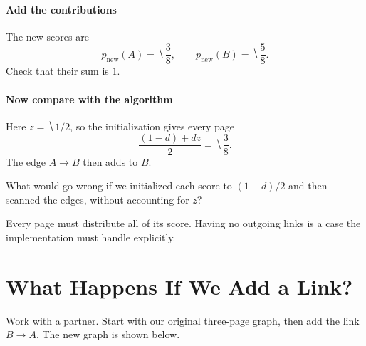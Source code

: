 \documentclass[11pt]{article}
\begin{document}
\paragraph{Add the contributions}
The new scores are
\begin{equation*}
    p_{\mathrm{new}}(A)=\hide{\frac38},\qquad
    p_{\mathrm{new}}(B)=\hide{\frac58}.
\end{equation*}
Check that their sum is $1$.

\paragraph{Now compare with the algorithm}
Here $z=\hide{1/2}$, so the initialization gives every page
\begin{equation*}
    \frac{(1-d)+dz}{2}=\hide{\frac38}.
\end{equation*}
The edge $A\to B$ then adds  to $B$.

\begin{Qu}
    What would go wrong if we initialized each score to $(1-d)/2$ and
    then scanned the edges, without accounting for $z$?
\end{Qu}
\vs{1cm}

\vfill
Every page must distribute all of its score. Having no outgoing links is a
case the implementation must handle explicitly.

\newpage
\section{What Happens If We Add a Link?}
Work with a partner. Start with our original three-page graph, then add the
link $B\to A$. The new graph is shown below.

\begin{center}
\end{center}
\end{document}
